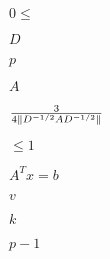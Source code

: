 \documentclass{article}
\begin{document}
$0 \le$


\pagebreak


$D$


\pagebreak


$p$


\pagebreak


$A$


\pagebreak


$3 \over {4\|D^{-1/2}AD^{-1/2}\|}$


\pagebreak


$\le 1$


\pagebreak


$A^T x = b$


\pagebreak


$v$


\pagebreak


$k$


\pagebreak


$p-1$


\pagebreak
\end{document}
